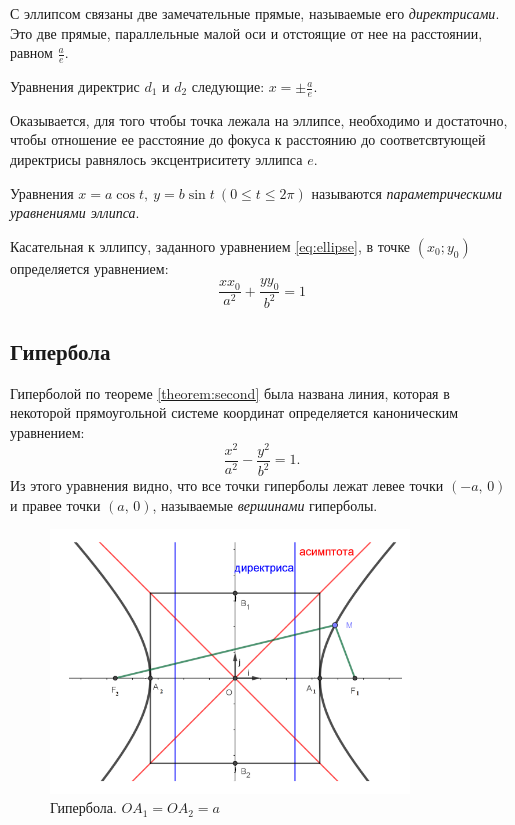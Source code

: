 \begin{definition}
  С эллипсом связаны две замечательные прямые, называемые его \textit{директрисами}. Это две прямые, параллельные  малой оси и отстоящие от нее на расстоянии, равном $\frac{a}{e}$. 
  
  Уравнения директрис $d_1$ и $d_2$ следующие: $x = \pm \frac{a}{e}$.
\end{definition}
Оказывается, для того чтобы точка лежала на эллипсе, необходимо и достаточно, чтобы отношение ее расстояние до фокуса к расстоянию до соответсвтующей директрисы равнялось эксцентриситету эллипса $e$.

Уравнения $x = a \cos t, ~ y = b\sin t ~(0 \leq t \leq 2\pi)$ называются \textit{параметрическими уравнениями эллипса}.

Касательная к эллипсу, заданного уравнением \ref{eq:ellipse}, в точке $(x_0; y_0)$ определяется уравнением:
$$
  \frac{xx_0}{a^2} + \frac{yy_0}{b^2} = 1
$$

\subsection*{Гипербола}
Гиперболой по теореме \ref{theorem:second} была названа линия, которая в некоторой прямоугольной системе координат определяется каноническим уравнением:
\begin{equation}
  \label{eq:hyperbola}
  \frac{x^2}{a^2} - \frac{y^2}{b^2} = 1.
\end{equation}
Из этого уравнения видно, что все точки гиперболы лежат левее точки $(-a,\, 0)$ и правее точки $(a, \, 0)$, называемые \textit{вершинами} гиперболы.

\begin{figure}[H]
  \centering
  \includegraphics[height = 7cm]{images/second_hyperbola.png}
  \caption{Гипербола. $OA_1 = OA_2 = a$}
  \label{fig:hyperbola}
\end{figure}

